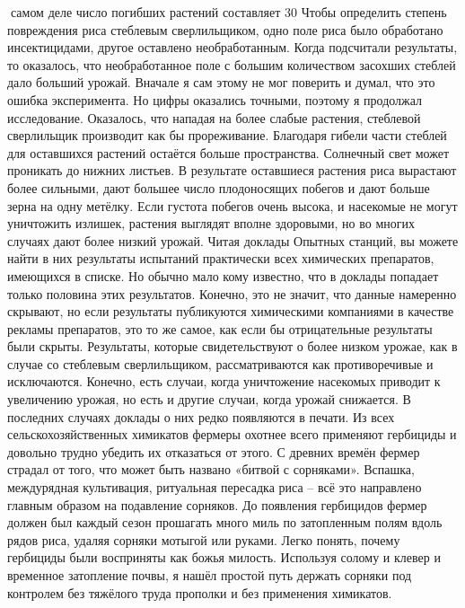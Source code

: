 \documentclass[a4paper]{book}
\begin{document}
самом деле число погибших растений составляет 30 %
Чтобы определить степень повреждения риса стеблевым сверлильщиком, одно поле
риса было обработано инсектицидами, другое оставлено необработанным. Когда подсчитали
результаты, то оказалось, что необработанное поле с большим количеством засохших стеблей
дало больший урожай. Вначале я сам этому не мог поверить и думал, что это ошибка
эксперимента. Но цифры оказались точными, поэтому я продолжал исследование.
Оказалось, что нападая на более слабые растения, стеблевой сверлильщик производит
как бы прореживание. Благодаря гибели части стеблей для оставшихся растений остаётся
больше пространства. Солнечный свет может проникать до нижних листьев. В результате
оставшиеся растения риса вырастают более сильными, дают большее число плодоносящих
побегов и дают больше зерна на одну метёлку. Если густота побегов очень высока, и
насекомые не могут уничтожить излишек, растения выглядят вполне здоровыми, но во
многих случаях дают более низкий урожай.
Читая доклады Опытных станций, вы можете найти в них результаты испытаний
практически всех химических препаратов, имеющихся в списке. Но обычно мало кому
известно, что в доклады попадает только половина этих результатов. Конечно, это не значит,
что данные намеренно скрывают, но если результаты публикуются химическими
компаниями в качестве рекламы препаратов, это то же самое, как если бы отрицательные
результаты были скрыты. Результаты, которые свидетельствуют о более низком урожае, как в
случае со стеблевым сверлильщиком, рассматриваются как противоречивые и исключаются.
Конечно, есть случаи, когда уничтожение насекомых приводит к увеличению урожая, но есть
и другие случаи, когда урожай снижается. В последних случаях доклады о них редко
появляются в печати.
Из всех сельскохозяйственных химикатов фермеры охотнее всего применяют гербициды
и довольно трудно убедить их отказаться от этого. С древних времён фермер страдал от того,
что может быть названо «битвой с сорняками». Вспашка, междурядная культивация,
ритуальная пересадка риса – всё это направлено главным образом на подавление сорняков.
До появления гербицидов фермер должен был каждый сезон прошагать много миль по
затопленным полям вдоль рядов риса, удаляя сорняки мотыгой или руками. Легко понять,
почему гербициды были восприняты как божья милость. Используя солому и клевер и
временное затопление почвы, я нашёл простой путь держать сорняки под контролем без
тяжёлого труда прополки и без применения химикатов.
\end{document}
